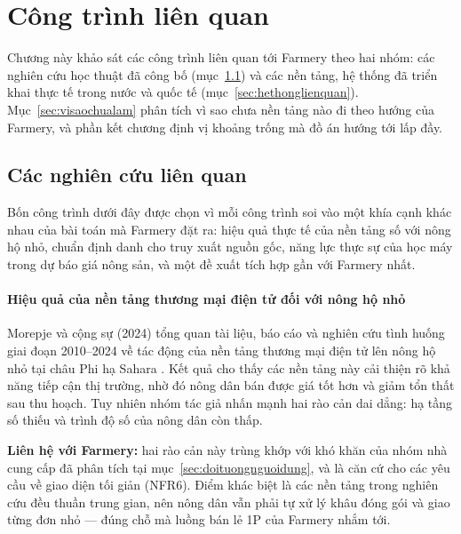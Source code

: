 \chapter{Công trình liên quan}
\label{chap:lienquan}

Chương này khảo sát các công trình liên quan tới Farmery theo hai nhóm: các nghiên cứu học thuật đã công bố (mục~\ref{sec:nghiencuulienquan}) và các nền tảng, hệ thống đã triển khai thực tế trong nước và quốc tế (mục~\ref{sec:hethonglienquan}). Mục~\ref{sec:visaochualam} phân tích vì sao chưa nền tảng nào đi theo hướng của Farmery, và phần kết chương định vị khoảng trống mà đồ án hướng tới lấp đầy.

\section{Các nghiên cứu liên quan}
\label{sec:nghiencuulienquan}

Bốn công trình dưới đây được chọn vì mỗi công trình soi vào một khía cạnh khác nhau của bài toán mà Farmery đặt ra: hiệu quả thực tế của nền tảng số với nông hộ nhỏ, chuẩn định danh cho truy xuất nguồn gốc, năng lực thực sự của học máy trong dự báo giá nông sản, và một đề xuất tích hợp gần với Farmery nhất.

\subsubsection*{Hiệu quả của nền tảng thương mại điện tử đối với nông hộ nhỏ}

Morepje và cộng sự (2024) tổng quan tài liệu, báo cáo và nghiên cứu tình huống giai đoạn 2010--2024 về tác động của nền tảng thương mại điện tử lên nông hộ nhỏ tại châu Phi hạ Sahara \parencite{morepje2024ecommerce}. Kết quả cho thấy các nền tảng này cải thiện rõ khả năng tiếp cận thị trường, nhờ đó nông dân bán được giá tốt hơn và giảm tổn thất sau thu hoạch. Tuy nhiên nhóm tác giả nhấn mạnh hai rào cản dai dẳng: hạ tầng số thiếu và trình độ số của nông dân còn thấp.

\textbf{Liên hệ với Farmery:} hai rào cản này trùng khớp với khó khăn của nhóm nhà cung cấp đã phân tích tại mục~\ref{sec:doituongnguoidung}, và là căn cứ cho các yêu cầu về giao diện tối giản (NFR6). Điểm khác biệt là các nền tảng trong nghiên cứu đều thuần trung gian, nên nông dân vẫn phải tự xử lý khâu đóng gói và giao từng đơn nhỏ --- đúng chỗ mà luồng bán lẻ 1P của Farmery nhắm tới.

